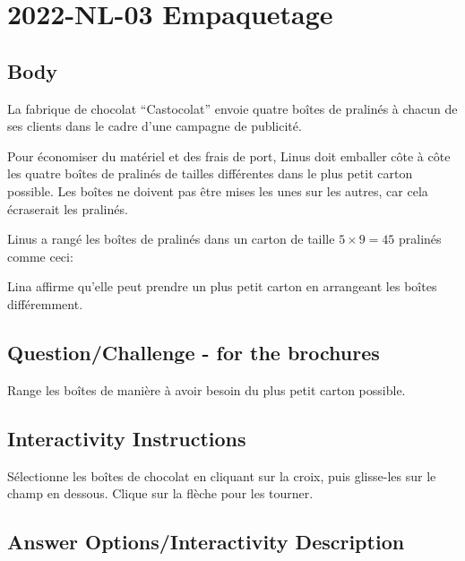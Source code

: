 \documentclass[a4paper,11pt]{report}
\newcommand{\taskGraphicsFolder}{..}
\begin{document}
\section*{\centering{} 2022-NL-03 Empaquetage}


\subsection*{Body}

La fabrique de chocolat “Castocolat” envoie quatre boîtes de pralinés à chacun de ses clients dans le cadre d’une campagne de publicité.

Pour économiser du matériel et des frais de port, Linus doit emballer côte à côte les quatre boîtes de pralinés de tailles différentes dans le plus petit carton possible. Les boîtes ne doivent pas être mises les unes sur les autres, car cela écraserait les pralinés.

Linus a rangé les boîtes de pralinés dans un carton de taille ${5 \times 9 = 45}$ pralinés comme ceci:

{\centering%
\par}

Lina affirme qu’elle peut prendre un plus petit carton en arrangeant les boîtes différemment.

{\em


\subsection*{Question/Challenge - for the brochures}

Range les boîtes de manière à avoir besoin du plus petit carton possible.

{\centering%
\par}

}


\subsection*{Interactivity Instructions}

Sélectionne les boîtes de chocolat en cliquant sur la croix, puis glisse-les sur le champ en dessous. Clique sur la flèche pour les tourner.

\begingroup
\renewcommand{\arraystretch}{1.5}
\subsection*{Answer Options/Interactivity Description}
\end{document}
